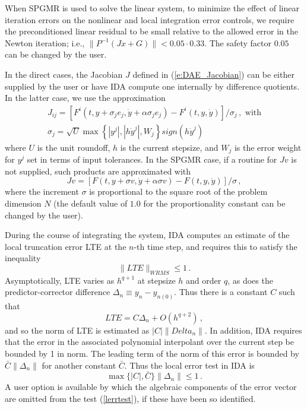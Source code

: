 When SPGMR is used to solve the linear system, to minimize the effect of
linear iteration errors on the nonlinear and local integration error controls,
we require the preconditioned linear residual to be small relative to the 
allowed error in the Newton iteration; i.e., 
$\| P^{-1}(Jx+G) \| < 0.05 \cdot 0.33$.
The safety factor $0.05$ can be changed by the user.

In the direct cases, the Jacobian $J$ defined in (\ref{e:DAE_Jacobian}) 
can be either supplied by the user or have IDA compute one internally 
by difference quotients. In the latter case, we use the approximation
\begin{gather*}
  J_{ij} = [F^i(t,y+\sigma_j e_j,{\dot y}+\alpha\sigma_j e_j) - 
  F^i(t,y,{\dot y})]/\sigma_j \, , \text{ with}\\
  \sigma_j = \sqrt{U} \max \left\{ 
    |y^j|, |h{\dot y}^j|,W_j 
  \right\} sign(h {\dot y}^j)
\end{gather*}
where $U$ is the unit roundoff, $h$ is the current stepsize, and $W_j$ is 
the error weight for $y^j$ set in terms of input tolerances. 
%
In the SPGMR case, if a routine for $Jv$ is not supplied, such products are
approximated with
\begin{equation*}
Jv = [F(t,y+\sigma v,{\dot y}+\alpha\sigma v) - F(t,y,{\dot y})]/\sigma \, ,
\end{equation*}
where the increment $\sigma$ is proportional to the square root of the problem 
dimension $N$ (the default value of $1.0$ for the proportionality constant can 
be changed by the user).

During the course of integrating the system, IDA computes an estimate
of the local truncation error LTE at the $n$-th time step, and
requires this to satisfy the inequality
\begin{equation}\label{Errtest}
  \| LTE \|_{WRMS} \leq 1 \, .               
\end{equation}
Asymptotically, LTE varies as $h^{q+1}$ at stepsize $h$ and order $q$, as
does the predictor-corrector difference $\Delta_n \equiv y_n-y_{n(0)}$.  
Thus there is a constant $C$ such that
\[ LTE = C \Delta_n + O(h^{q+2}) \, , \]
and so the norm of LTE is estimated as $|C| \|Delta_n\|$.
In addition, IDA requires that the error in the associated polynomial
interpolant over the current step be bounded by 1 in norm.  The
leading term of the norm of this error is bounded by
$\bar{C} \|\Delta_n\|$ for another constant $\bar{C}$.  Thus the local
error test in IDA is
\begin{equation}\label{lerrtest}
   \max\{ |C|, \bar{C} \} \|\Delta_n\| \leq 1 \, .
\end{equation}
A user option is available by which the algebraic components of the
error vector are omitted from the test (\ref{lerrtest}), if these have
been so identified.

